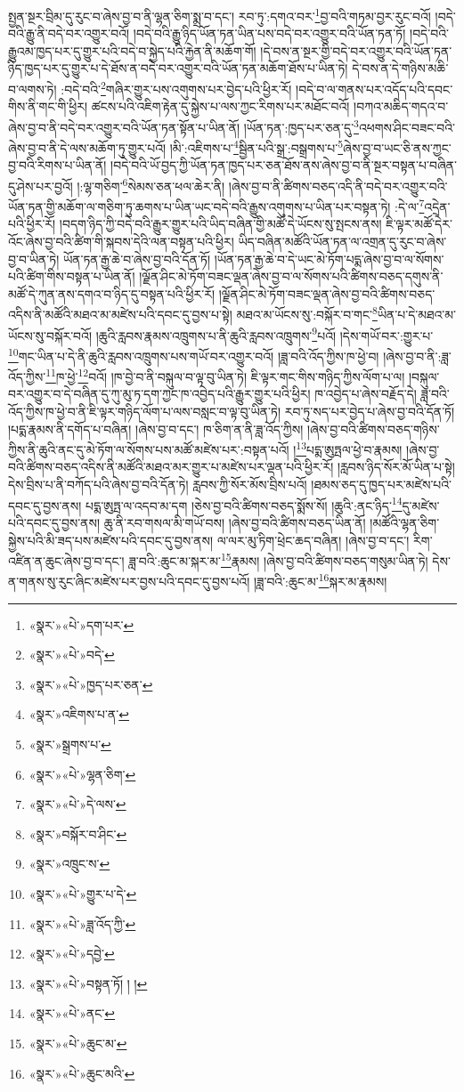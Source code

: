 སྤྱན་སྔར་བྲིམ་དུ་རུང་བ་ཞེས་བྱ་བ་ནི་ལྷན་ཅིག་སྨྲ་བ་དང་། རབ་ཏུ་:དགའ་བར་\footnote{«སྣར་»«པེ་»དག་པར་}བྱ་བའི་གཏམ་བྱར་རུང་བའོ། །བདེ་བའི་རྒྱུ་ནི་བདེ་བར་འགྱུར་བའོ། །བདེ་བའི་རྒྱུ་ཉིད་ཡོན་ཏན་ཡིན་པས་བདེ་བར་འགྱུར་བའི་ཡོན་ཏན་ཏོ། །བདེ་བའི་རྒྱུའམ་ཁྱད་པར་དུ་གྱུར་པའི་བདེ་བ་སྐྱེད་པའི་རྐྱེན་ནི་མཆོག་གོ། །དེ་བས་ན་སྔར་གྱི་བདེ་བར་འགྱུར་བའི་ཡོན་ཏན་ཉིད་ཁྱད་པར་དུ་གྱུར་པ་དེ་ཐོས་ན་བདེ་བར་འགྱུར་བའི་ཡོན་ཏན་མཆོག་ཐོས་པ་ཡིན་ཏེ། དེ་བས་ན་དེ་གཉིས་མཆི་བ་ལགས་ཏེ། :བདེ་བའི་\footnote{«སྣར་»«པེ་»བདེ་}གཞིར་གྱུར་པས་འགུགས་པར་བྱེད་པའི་ཕྱིར་རོ། །བདེ་བ་ལ་གནས་པར་འདོད་པའི་དབང་གིས་ནི་གང་གི་ཕྱིར། ཚངས་པའི་འཇིག་རྟེན་དུ་སྐྱེས་པ་ལས་ཀྱང་རིགས་པར་མཐོང་བའོ། །བཀའ་མཆིད་གདའ་བ་ཞེས་བྱ་བ་ནི་བདེ་བར་འགྱུར་བའི་ཡོན་ཏན་སྟོན་པ་ཡིན་ནོ། །ཡོན་ཏན་:ཁྱད་པར་ཅན་དུ་\footnote{«སྣར་»«པེ་»ཁྱད་པར་ཅན་}འཕགས་ཤིང་བཟང་བའི་ཞེས་བྱ་བ་ནི་དེ་ལས་མཆོག་ཏུ་གྱུར་པའོ། །མི་:འཇིགས་པ་\footnote{«སྣར་»འཇིགས་པ་ན་}སྦྱིན་པའི་སྒྲ་:བསྒྲགས་པ་\footnote{«སྣར་»སྒྲགས་པ་}ཞེས་བྱ་བ་ཡང་ཅི་ནས་ཀྱང་བྱ་བའི་རིགས་པ་ཡིན་ནོ། །བདེ་བའི་ཡོ་བྱད་ཀྱི་ཡོན་ཏན་ཁྱད་པར་ཅན་ཐོས་ནས་ཞེས་བྱ་བ་ནི་སྔར་བསྟན་པ་བཞིན་དུ་ཤེས་པར་བྱའོ། །:ལྷ་གཅིག་\footnote{«སྣར་»«པེ་»ལྷན་ཅིག་}སེམས་ཅན་ཕལ་ཆེར་ནི། །ཞེས་བྱ་བ་ནི་ཚིགས་བཅད་འདི་ནི་བདེ་བར་འགྱུར་བའི་ཡོན་ཏན་གྱི་མཆོག་ལ་གཅིག་ཏུ་ཆགས་པ་ཡིན་ཡང་བདེ་བའི་རྒྱུས་འགུགས་པ་ཡིན་པར་བསྟན་ཏེ། :དེ་ལ་\footnote{«སྣར་»«པེ་»དེ་ལས་}འདྲེན་པའི་ཕྱིར་རོ། །བདག་ཉིད་ཀྱི་བདེ་བའི་རྒྱུར་གྱུར་པའི་ཡིད་བཞིན་གྱི་མཚོ་དེ་ཡོངས་སུ་སྤངས་ནས། ཇི་ལྟར་མཚོ་དེར་འོང་ཞེས་བྱ་བའི་ཚིག་གི་སྐབས་དེའི་ལན་བསྟན་པའི་ཕྱིར། ཡིད་བཞིན་མཚོའི་ཡོན་ཏན་ལ་འགྲན་དུ་རུང་བ་ཞེས་བྱ་བ་ཡིན་ཏེ། ཡོན་ཏན་རྒྱ་ཆེ་བ་ཞེས་བྱ་བའི་དོན་ཏོ། །ཡོན་ཏན་རྒྱ་ཆེ་བ་དེ་ཡང་མེ་ཏོག་པདྨ་ཞེས་བྱ་བ་ལ་སོགས་པའི་ཚིག་གིས་བསྟན་པ་ཡིན་ནོ། །ལྗོན་ཤིང་མེ་ཏོག་བཟང་ལྡན་ཞེས་བྱ་བ་ལ་སོགས་པའི་ཚིགས་བཅད་དགུས་ནི་མཚོ་དེ་ཀུན་ནས་དགའ་བ་ཉིད་དུ་བསྟན་པའི་ཕྱིར་རོ། །ལྗོན་ཤིང་མེ་ཏོག་བཟང་ལྡན་ཞེས་བྱ་བའི་ཚིགས་བཅད་འདིས་ནི་མཚོའི་མཐའ་མ་མཛེས་པའི་དབང་དུ་བྱས་པ་སྟེ། མཐའ་མ་ཡོངས་སུ་:བསྐོར་བ་གང་\footnote{«སྣར་»བསྐོར་བ་ཤིང་}ཡིན་པ་དེ་མཐའ་མ་ཡོངས་སུ་བསྐོར་བའོ། །ཆུའི་རླབས་རྣམས་འཁྲུགས་པ་ནི་ཆུའི་རླབས་འཁྲུགས་\footnote{«སྣར་»འཁྲུང་ས་}པའོ། །དེས་གཡོ་བར་:གྱུར་པ་\footnote{«སྣར་»«པེ་»གྱུར་པ་དེ་}གང་ཡིན་པ་དེ་ནི་ཆུའི་རླབས་འཁྲུགས་པས་གཡོ་བར་འགྱུར་བའོ། །ཟླ་བའི་འོད་ཀྱིས་ཁ་ཕྱེ་བ། །ཞེས་བྱ་བ་ནི་:ཟླ་འོད་ཀྱིས་\footnote{«སྣར་»«པེ་»ཟླ་འོད་ཀྱི་}ཁ་ཕྱེ་\footnote{«སྣར་»«པེ་»དབྱེ་}བའོ། །ཁ་བྱེ་བ་ནི་བསྐུལ་བ་ལྟ་བུ་ཡིན་ཏེ། ཇི་ལྟར་གང་གིས་གཉིད་ཀྱིས་ལོག་པ་ལ། །བསྐུལ་བར་འགྱུར་བ་དེ་བཞིན་དུ་ཀུ་མུ་ཏ་དག་ཀྱང་ཁ་འབྱེད་པའི་རྒྱུར་གྱུར་པའི་ཕྱིར། ཁ་འབྱེད་པ་ཞེས་བརྗོད་དེ། ཟླ་བའི་འོད་ཀྱིས་ཁ་ཕྱེ་བ་ནི་ཇི་ལྟར་གཉིད་ལོག་པ་ལས་བསླང་བ་ལྟ་བུ་ཡིན་ཏེ། རབ་ཏུ་སད་པར་བྱེད་པ་ཞེས་བྱ་བའི་དོན་ཏོ། །པདྨ་རྣམས་ནི་དགོད་པ་བཞིན། །ཞེས་བྱ་བ་དང་། ཁ་ཅིག་ན་ནི་ཟླ་འོད་ཀྱིས། །ཞེས་བྱ་བའི་ཚིགས་བཅད་གཉིས་ཀྱིས་ནི་ཆུའི་ནང་དུ་མེ་ཏོག་ལ་སོགས་པས་མཚོ་མཛེས་པར་:བསྟན་པའོ། །\footnote{«སྣར་»«པེ་»བསྟན་ཏོ། ། །}པདྨ་ཨུཏྤལ་ཕྱེ་བ་རྣམས། །ཞེས་བྱ་བའི་ཚིགས་བཅད་འདིས་ནི་མཚོའི་མཐའ་མར་གྱུར་པ་མཛེས་པར་ལྡན་པའི་ཕྱིར་རོ། །རླབས་ཉིད་སོར་མོ་ཡིན་པ་སྟེ། དེས་བྲིས་པ་ནི་བཀོད་པའི་ཞེས་བྱ་བའི་དོན་ཏེ། རླབས་ཀྱི་སོར་མོས་བྲིས་པའོ། །ཐམས་ཅད་དུ་ཁྱད་པར་མཛེས་པའི་དབང་དུ་བྱས་ནས། པདྨ་ཨུཏྤ་ལ་འདབ་མ་དག །ཅེས་བྱ་བའི་ཚིགས་བཅད་སྨོས་སོ། །ཆུའི་:ནང་ཉིད་\footnote{«སྣར་»«པེ་»ནང་}དུ་མཛེས་པའི་དབང་དུ་བྱས་ནས། ཆུ་ནི་རབ་གསལ་མི་གཡོ་བས། །ཞེས་བྱ་བའི་ཚིགས་བཅད་ཡིན་ནོ། །མཚོའི་ལྷན་ཅིག་སྐྱེས་པའི་མི་ཟད་པས་མཛེས་པའི་དབང་དུ་བྱས་ནས། ལ་ལར་མུ་ཏིག་ཕྲེང་ཆད་བཞིན། །ཞེས་བྱ་བ་དང་། རིག་འཛིན་ན་ཆུང་ཞེས་བྱ་བ་དང་། ཟླ་བའི་:ཆུང་མ་སྐར་མ་\footnote{«སྣར་»«པེ་»ཆུང་མ་}རྣམས། །ཞེས་བྱ་བའི་ཚིགས་བཅད་གསུམ་ཡིན་ཏེ། དེས་ན་གནས་སུ་རུང་ཞིང་མཛེས་པར་བྱས་པའི་དབང་དུ་བྱས་པའོ། །ཟླ་བའི་:ཆུང་མ་\footnote{«སྣར་»«པེ་»ཆུང་མའི་}སྐར་མ་རྣམས། 